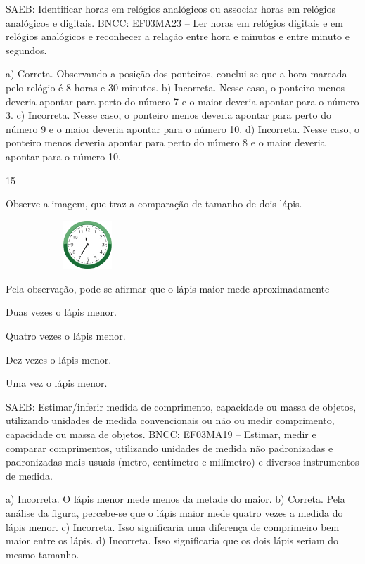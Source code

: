 \begin{multicols}{2}
{\begin{escolha}
{SAEB: Identificar horas em relógios analógicos ou associar
horas em relógios analógicos e digitais.
BNCC: EF03MA23 – Ler horas em relógios digitais e em relógios analógicos e reconhecer a relação
entre hora e minutos e entre minuto e segundos.


a) Correta. Observando a posição dos ponteiros, conclui-se que a hora marcada pelo
relógio é 8 horas e 30 minutos.
b) Incorreta. Nesse caso, o ponteiro menos deveria apontar para perto do número 7 e o maior deveria apontar para o número 3.
c) Incorreta. Nesse caso, o ponteiro menos deveria apontar para perto do número 9 e o maior deveria apontar para o número 10.
d) Incorreta. Nesse caso, o ponteiro menos deveria apontar para perto do número 8 e o maior deveria apontar para o número 10.

\num{15}

Observe a imagem, que traz a comparação de tamanho de dois lápis.


\includegraphics[width=2.43137in,height=0.71356in]{media/image116.png}

Pela observação, pode-se afirmar que o lápis maior mede aproximadamente

\begin{escolha}
\item
  Duas vezes o lápis menor.
\item
  Quatro vezes o lápis menor.
\item
  Dez vezes o lápis menor.
\item
  Uma vez o lápis menor.
\end{escolha}

SAEB: Estimar/inferir medida de comprimento, capacidade ou
massa de objetos, utilizando unidades de medida convencionais ou não ou
medir comprimento, capacidade ou massa de objetos.
BNCC: EF03MA19 -- Estimar, medir e comparar comprimentos, utilizando unidades de medida
não padronizadas e padronizadas mais usuais (metro, centímetro e milímetro) e diversos
instrumentos de medida.

a) Incorreta. O lápis menor mede menos da metade do maior.
b) Correta. Pela análise da figura, percebe-se que o lápis maior mede quatro vezes a medida do lápis menor.
c) Incorreta. Isso significaria uma diferença de comprimeiro bem maior entre os lápis.
d) Incorreta. Isso significaria que os dois lápis seriam do mesmo tamanho.

}
\end{escolha}}
\end{multicols}
